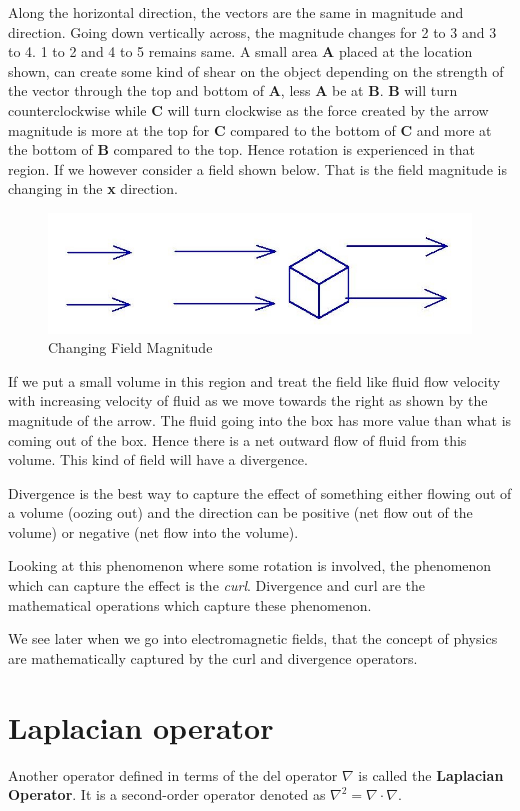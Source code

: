 Along the horizontal direction, the vectors are the same in magnitude and direction. Going down vertically across, the magnitude changes for 2 to 3 and 3 to 4. 1 to 2 and 4 to 5 remains same. A small area \textbf{A} placed at the location shown, can create some kind of shear on the object depending on the strength of the vector through the top and bottom of \textbf{A}, less \textbf{A} be at \textbf{B}. \textbf{B} will turn counterclockwise while \textbf{C} will turn clockwise as the force created by the arrow magnitude is more at the top for \textbf{C} compared to the bottom of \textbf{C} and more at the bottom of \textbf{B} compared to the top. Hence rotation is experienced in that region. If we however consider a field shown below. That is the field magnitude is changing in the \textbf{x} direction.
\begin{figure}[h]
\centering
\includegraphics[width=1\linewidth]{./graphics/fig172}
\caption{Changing Field Magnitude}
\end{figure}

If we put a small volume in this region and treat the field like fluid flow velocity with increasing velocity of fluid as we move towards the right as shown by the magnitude of the arrow. The fluid going into the box has more value than what is coming out of the box. Hence there is a net outward flow of fluid from this volume. This kind of field will have a divergence.

Divergence is the best way to capture the effect of something either flowing out of a volume (oozing out) and the direction can be positive (net flow out of the volume) or negative (net flow into the volume).

Looking at this phenomenon where some rotation is involved, the phenomenon which can capture the effect is the \textit{curl}. Divergence and curl are the mathematical operations which capture these phenomenon.

We see later when we go into electromagnetic fields, that the concept of physics are mathematically captured by the curl and divergence operators.

\section{Laplacian operator}
Another operator defined in terms of the del operator $\nabla$ is called the \textbf{Laplacian Operator}. It is a second-order operator denoted as $\nabla^2 = \nabla \cdot \nabla$.

